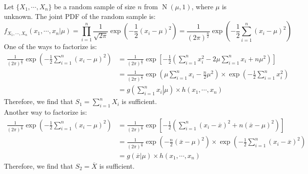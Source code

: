 \documentclass{huhtakm-template-book-v2}
\DeclareMathOperator{\N}{N}
\begin{document}
\begin{eg}
	\label{Chapter 3 (Example) Sufficient statistic for normal distribution with unit variance}
	Let $\{X_{1},\cdots,X_{n}\}$ be a random sample of size $n$ from $\N(\mu,1)$, where $\mu$ is unknown. The joint PDF of the random sample is:
	\begin{equation*}
		f_{X_{1},\cdots,X_{n}}(x_{1},\cdots,x_{n}|\mu)=\prod_{i=1}^{n}\frac{1}{\sqrt{2\pi}}\exp\left(-\frac{1}{2}(x_{i}-\mu)^{2}\right)=\frac{1}{(2\pi)^{\frac{n}{2}}}\exp\left(-\frac{1}{2}\sum_{i=1}^{n}(x_{i}-\mu)^{2}\right)		
	\end{equation*}
	One of the ways to factorize is:
	\begin{align*}
		\frac{1}{(2\pi)^{\frac{n}{2}}}\exp\left(-\frac{1}{2}\sum_{i=1}^{n}(x_{i}-\mu)^{2}\right)&=\frac{1}{(2\pi)^{\frac{n}{2}}}\exp\left[-\frac{1}{2}\left(\sum_{i=1}^{n}x_{i}^{2}-2\mu\sum_{i=1}^{n}x_{i}+n\mu^{2}\right)\right]\\
		&=\frac{1}{(2\pi)^{\frac{n}{2}}}\exp\left(\mu\sum_{i=1}^{n}x_{i}-\frac{n}{2}\mu^{2}\right)\times\exp\left(-\frac{1}{2}\sum_{i=1}^{n}x_{i}^{2}\right)\\
		&=g\left(\left.\sum_{i=1}^{n}x_{i}\right|\mu\right)\times h(x_{1},\cdots,x_{n})
	\end{align*}
	Therefore, we find that $S_{1}=\sum_{i=1}^{n}X_{i}$ is sufficient.\\
	Another way to factorize is:
	\begin{align*}
		\frac{1}{(2\pi)^{\frac{n}{2}}}\exp\left(-\frac{1}{2}\sum_{i=1}^{n}(x_{i}-\mu)^{2}\right)&=	\frac{1}{(2\pi)^{\frac{n}{2}}}\exp\left[-\frac{1}{2}\left(\sum_{i=1}^{n}(x_{i}-\overline{x})^{2}+n(\overline{x}-\mu)^{2}\right)\right]\\
		&=\frac{1}{(2\pi)^{\frac{n}{2}}}\exp\left(-\frac{n}{2}(\overline{x}-\mu)^{2}\right)\times\exp\left(-\frac{1}{2}\sum_{i=1}^{n}(x_{i}-\overline{x})^{2}\right)\\
		&=g(\overline{x}|\mu)\times h(x_{1},\cdots,x_{n})
	\end{align*}
	Therefore, we find that $S_{2}=\overline{X}$ is sufficient.
\end{eg}
\end{document}
